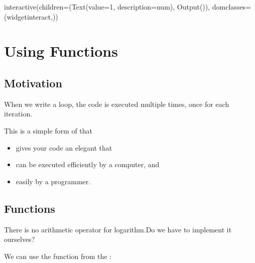 \documentclass[letterpaper,10pt,english]{sphinxmanual}
\begin{document}
\begin{sphinxVerbatim}[commandchars=\\\{\}]
interactive(children=(Text(value=\PYGZsq{}1\PYGZsq{}, description=\PYGZsq{}num\PYGZsq{}), Output()), \PYGZus{}dom\PYGZus{}classes=(\PYGZsq{}widget\PYGZhy{}interact\PYGZsq{},))
\end{sphinxVerbatim}


\chapter{Using Functions}
\label{\detokenize{Lecture4/Using Functions:using-functions}}\label{\detokenize{Lecture4/Using Functions::doc}}

\section{Motivation}
\label{\detokenize{Lecture4/Using Functions:motivation}}

When we write a loop, the code is executed multiple times, once for each iteration.

This is a simple form of  that
\begin{itemize}
\item {} 
gives your code an elegant  that

\item {} 
can be executed efficiently by a computer, and

\item {} 
 easily by a programmer.

\end{itemize}



\section{Functions}
\label{\detokenize{Lecture4/Using Functions:functions}}

There is no arithmetic operator for logarithm.Do we have to implement it ourselves?

We can use the function  from the :
\end{document}
